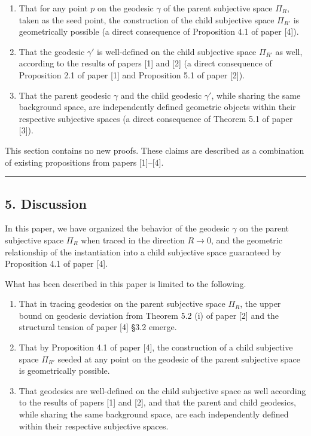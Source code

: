 \documentclass[a4paper,11pt]{article}
\theoremstyle{definition}
\providecommand{\tightlist}{\setlength{\itemsep}{0pt}\setlength{\parskip}{0pt}}
\begin{document}
\begin{enumerate}
\def\labelenumi{\arabic{enumi}.}
\tightlist
\item
  That for any point \(p\) on the geodesic \(\gamma\) of the parent subjective space \(\Pi_R\), taken as the seed point, the construction of the child subjective space \(\Pi_{R'}\) is geometrically possible (a direct consequence of Proposition 4.1 of paper {[}4{]}).
\item
  That the geodesic \(\gamma'\) is well-defined on the child subjective space \(\Pi_{R'}\) as well, according to the results of papers {[}1{]} and {[}2{]} (a direct consequence of Proposition 2.1 of paper {[}1{]} and Proposition 5.1 of paper {[}2{]}).
\item
  That the parent geodesic \(\gamma\) and the child geodesic \(\gamma'\), while sharing the same background space, are independently defined geometric objects within their respective subjective spaces (a direct consequence of Theorem 5.1 of paper {[}3{]}).
\end{enumerate}

This section contains no new proofs. These claims are described as a combination of existing propositions from papers {[}1{]}--{[}4{]}.

\begin{center}\rule{0.5\linewidth}{0.5pt}\end{center}

\subsection{5. Discussion}\label{discussion}

In this paper, we have organized the behavior of the geodesic \(\gamma\) on the parent subjective space \(\Pi_R\) when traced in the direction \(R \to 0\), and the geometric relationship of the instantiation into a child subjective space guaranteed by Proposition 4.1 of paper {[}4{]}.

What has been described in this paper is limited to the following.

\begin{enumerate}
\def\labelenumi{\arabic{enumi}.}
\tightlist
\item
  That in tracing geodesics on the parent subjective space \(\Pi_R\), the upper bound on geodesic deviation from Theorem 5.2 (i) of paper {[}2{]} and the structural tension of paper {[}4{]} §3.2 emerge.
\item
  That by Proposition 4.1 of paper {[}4{]}, the construction of a child subjective space \(\Pi_{R'}\) seeded at any point on the geodesic of the parent subjective space is geometrically possible.
\item
  That geodesics are well-defined on the child subjective space as well according to the results of papers {[}1{]} and {[}2{]}, and that the parent and child geodesics, while sharing the same background space, are each independently defined within their respective subjective spaces.
\end{enumerate}
\end{document}

